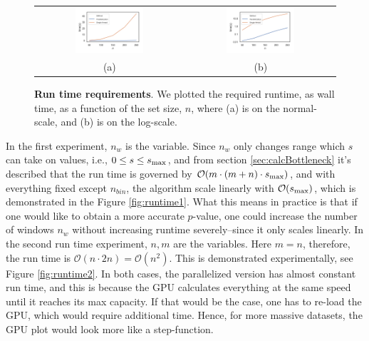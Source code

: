 \documentclass[a4paper]{article}
\begin{document}
\begin{figure}[H]
  \centering
  \begin{tabular}{cc}
  \includegraphics[width=0.48\textwidth]{figures/VarN.png}\label{fig:noarmal04} &  \includegraphics[width=0.48\textwidth]{figures/VarNLog.png}\label{fig:normal12} \\
  (a) & (b)
  \end{tabular}
  \caption{{\bf Run time requirements}. We plotted the required runtime, as wall time, as a function of the set size, $n$, where (a) is on the normal-scale, and (b) is on the log-scale.\label{fig:runtime4}}
\end{figure}


In the first experiment, $n_{w}$ is the variable. Since $n_{w}$ only changes range which $s$ can take on values, i.e., $0 \leq s \leq s_{\rm max}$, and from section \ref{sec:calcBottleneck} it's described that the run time is governed by $\mathcal{O}(m\cdot (m+n)\cdot s_{\rm max})$, and with everything fixed except $n_{bin}$, the algorithm scale linearly with $\mathcal{O}(s_{\rm max})$, which is demonstrated in the Figure \ref{fig:runtime1}. What this means in practice is that if one would like to obtain a more accurate $p$-value, one could increase the number of windows $n_w$ without increasing runtime severely–since it only scales linearly.
In the second run time experiment, $n,m$ are the variables. Here $m=n$, therefore, the run time is $\mathcal{O}(n \cdot 2n)=\mathcal{O}(n^{2})$. This is demonstrated experimentally, see Figure \ref{fig:runtime2}.
In both cases, the parallelized version has almost constant run time, and this is because the GPU calculates everything at the same speed until it reaches its max capacity. If that would be the case, one has to re-load the GPU, which would require additional time. Hence, for more massive datasets, the GPU plot would look more like a step-function. 
\end{document}
